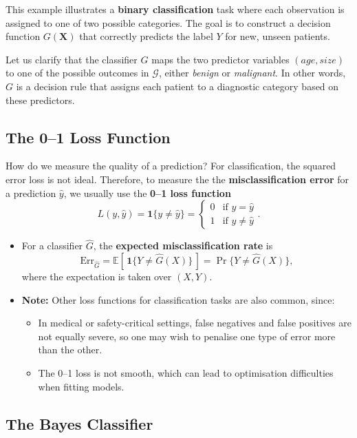 \documentclass[
  letterpaper,
  DIV=11,
  numbers=noendperiod]{scrartcl}
\providecommand{\tightlist}{%
  \setlength{\itemsep}{0pt}\setlength{\parskip}{0pt}}\usepackage{longtable,booktabs,array}
\begin{document}
This example illustrates a \textbf{binary classification} task where
each observation is assigned to one of two possible categories. The goal
is to construct a decision function \(G(\mathbf{X})\) that correctly
predicts the label \(Y\) for new, unseen patients.

Let us clarify that the classifier \(G\) maps the two predictor
variables \((\textit{age}, \textit{size})\) to one of the possible
outcomes in \(\mathcal{G}\), either \emph{benign} or \emph{malignant}.
In other words, \(G\) is a decision rule that assigns each patient to a
diagnostic category based on these predictors.

\subsection{The 0--1 Loss Function}\label{the-01-loss-function}

How do we measure the quality of a prediction? For classification, the
squared error loss is not ideal. Therefore, to measure the the
\textbf{misclassification error} for a prediction \(\hat{y}\), we
usually use the \textbf{0--1 loss function}
\[L(y, \hat{y}) = \mathbf{1}\{y \ne \hat{y}\} = 
  \begin{cases}
  0 & \text{if } y = \hat{y} \\
  1 & \text{if } y \ne \hat{y}
  \end{cases}.\]

\begin{itemize}
\item
  For a classifier \(\hat{G}\), the \textbf{expected misclassification
  rate} is
  \[\text{Err}_{\hat{G}} = \mathbb{E}[\,\mathbf{1}\{Y \ne \hat{G}(X)\}\,] = \Pr\{Y \ne \hat{G}(X)\}, \]
  where the expectation is taken over \((X, Y)\).
\item
  \textbf{Note:} Other loss functions for classification tasks are also
  common, since:

  \begin{itemize}
  \tightlist
  \item
    In medical or safety-critical settings, false negatives and false
    positives are not equally severe, so one may wish to penalise one
    type of error more than the other.
  \item
    The 0--1 loss is not smooth, which can lead to optimisation
    difficulties when fitting models.
  \end{itemize}
\end{itemize}

\subsection{The Bayes Classifier}\label{the-bayes-classifier}
\end{document}
